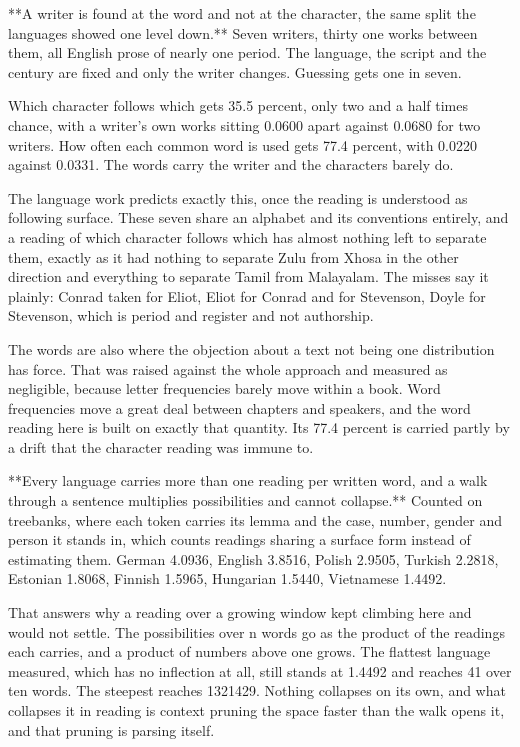 **A writer is found at the word and not at the character, the same split the languages showed one level down.** Seven writers, thirty one works between them, all English prose of nearly one period. The language, the script and the century are fixed and only the writer changes. Guessing gets one in seven.

Which character follows which gets 35.5 percent, only two and a half times chance, with a writer's own works sitting 0.0600 apart against 0.0680 for two writers. How often each common word is used gets 77.4 percent, with 0.0220 against 0.0331. The words carry the writer and the characters barely do.

The language work predicts exactly this, once the reading is understood as following surface. These seven share an alphabet and its conventions entirely, and a reading of which character follows which has almost nothing left to separate them, exactly as it had nothing to separate Zulu from Xhosa in the other direction and everything to separate Tamil from Malayalam. The misses say it plainly: Conrad taken for Eliot, Eliot for Conrad and for Stevenson, Doyle for Stevenson, which is period and register and not authorship.

The words are also where the objection about a text not being one distribution has force. That was raised against the whole approach and measured as negligible, because letter frequencies barely move within a book. Word frequencies move a great deal between chapters and speakers, and the word reading here is built on exactly that quantity. Its 77.4 percent is carried partly by a drift that the character reading was immune to.

**Every language carries more than one reading per written word, and a walk through a sentence multiplies possibilities and cannot collapse.** Counted on treebanks, where each token carries its lemma and the case, number, gender and person it stands in, which counts readings sharing a surface form instead of estimating them. German 4.0936, English 3.8516, Polish 2.9505, Turkish 2.2818, Estonian 1.8068, Finnish 1.5965, Hungarian 1.5440, Vietnamese 1.4492.

That answers why a reading over a growing window kept climbing here and would not settle. The possibilities over n words go as the product of the readings each carries, and a product of numbers above one grows. The flattest language measured, which has no inflection at all, still stands at 1.4492 and reaches 41 over ten words. The steepest reaches 1321429. Nothing collapses on its own, and what collapses it in reading is context pruning the space faster than the walk opens it, and that pruning is parsing itself.

